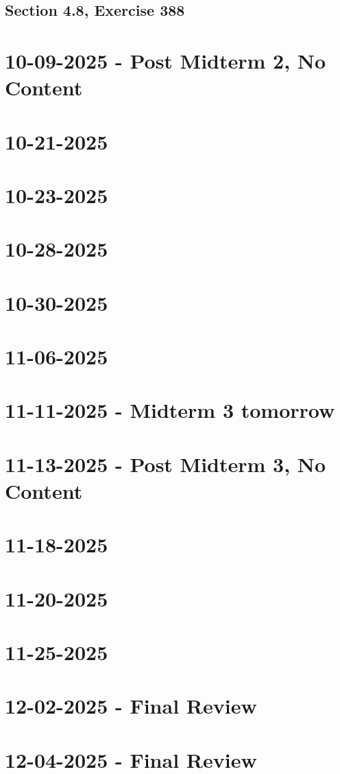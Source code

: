 \documentclass[]{mangos-musings}
\begin{document}
\subsection{Section 4.8, Exercise 388}


\newpage
\section{10-09-2025 - Post Midterm 2, No Content}

\newpage
\section{10-21-2025}

\newpage
\section{10-23-2025}

\newpage
\section{10-28-2025}

\newpage
\section{10-30-2025}

\newpage
\section{11-06-2025}

\newpage
\section{11-11-2025 - Midterm 3 tomorrow}

\newpage
\section{11-13-2025 - Post Midterm 3, No Content}

\newpage
\section{11-18-2025}

\newpage
\section{11-20-2025}

\newpage
\section{11-25-2025}

\newpage
\section{12-02-2025 - Final Review}

\newpage
\section{12-04-2025 - Final Review}
\end{document}
